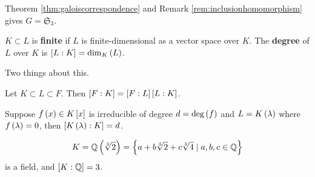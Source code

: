 Theorem \ref{thm:galoiscorrespondence} and Remark \ref{rem:inclusionhomomorphism} gives $ G = \mathfrak{S}_3 $.


\begin{definition}
$ K \subset L $ is \textbf{finite} if $ L $ is finite-dimensional as a vector space over $ K $. The \textbf{degree} of $ L $ over $ K $ is $ \sb{L : K} = \dim_{K}\rb{L} $.
\end{definition}

Two things about this.

\begin{theorem}
\label{thm:towerlaw}
Let $ K \subset L \subset F $. Then $ \sb{F : K} = \sb{F : L}\sb{L : K} $.
\end{theorem}

\begin{theorem}
\label{thm:2}
Suppose $ f\rb{x} \in K\sb{x} $ is irreducible of degree $ d = \deg\rb{f} $ and $ L = K\rb{\lambda} $ where $ f\rb{\lambda} = 0 $, then $ \sb{K\rb{\lambda} : K} = d $.
\end{theorem}

\begin{example}
$$ K = \Q\rb{\sqrt[3]{2}} = \cb{a + b\sqrt[3]{2} + c\sqrt[3]{4} \mid a, b, c \in \Q} $$
is a field, and $ \sb{K : \Q} = 3 $.
\end{example}

